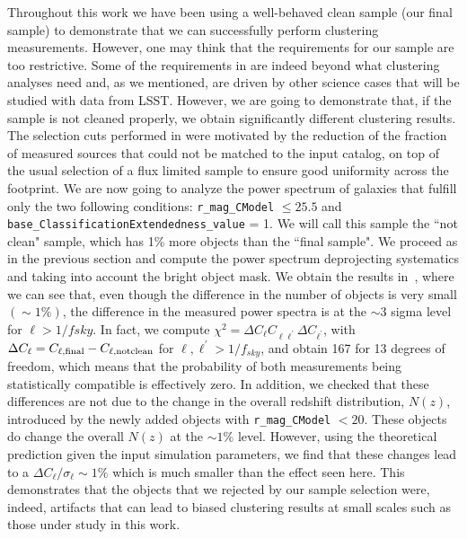 \documentclass[a4paper,fleqn,usenatbib]{mnras}
\begin{document}
Throughout this work we have been using a well-behaved clean sample (our final sample) to demonstrate that we can successfully perform clustering measurements. However, one may think that the requirements for our sample are too restrictive. Some of the requirements in  are indeed beyond what clustering analyses need and, as we mentioned, are driven by other science cases that will be studied with data from LSST. However, we are going to demonstrate that, if the sample is not cleaned properly, we obtain significantly different clustering results. The selection cuts performed in  were motivated by the reduction of the fraction of measured sources that could not be matched to the input catalog, on top of the usual selection of a flux limited sample to ensure good uniformity across the footprint. We are now going to analyze the power spectrum of galaxies that fulfill only the two following conditions: \texttt{r\_mag\_CModel} $\leq 25.5$ and  \texttt{base\_ClassificationExtendedness\_value} = 1. We will call this sample the ``not clean" sample, which has 1\% more objects than the ``final sample". We proceed as in the previous section and compute the power spectrum deprojecting systematics and taking into account the bright object mask. We obtain the results in~, where we can see that, even though the difference in the number of objects is very small $(\sim 1\%)$, the difference in the measured power spectra is at the $\sim 3$ sigma level for $\ell > 1/fsky$. In fact, we compute $\chi^{2} = \Delta C_{\ell} C_{\ell \ell^{\prime}} \Delta C_{\ell^{\prime}}$, with $\Delta C_{\ell} =  C_{\ell, \rm{final}} - C_{\ell, \rm{not clean}}$ for $\ell, \ell^{\prime} > 1/f_{sky}$, and obtain 167 for 13 degrees of freedom, which means that the probability of both measurements being statistically compatible is effectively zero. In addition, we checked that these differences are not due to the change in the overall redshift distribution, $N(z)$, introduced by the newly added objects with \texttt{r\_mag\_CModel} $< 20$. These objects do change the overall $N(z)$ at the $\sim 1\%$ level. However, using the theoretical prediction given the input simulation parameters, we find that these changes lead to a $\Delta C_{\ell}/\sigma_{\ell} \sim 1\%$ which is much smaller than the effect seen here. This demonstrates that the objects that we rejected by our sample selection were, indeed, artifacts that can lead to biased clustering results at small scales such as those under study in this work.
\end{document}
